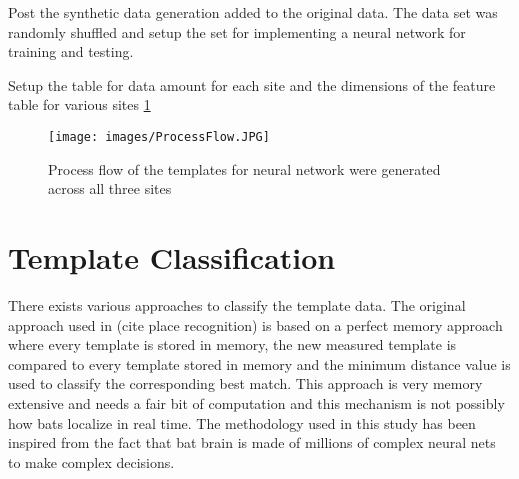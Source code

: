 \documentclass[11pt]{report}
\begin{document}
Post the synthetic data generation added to the original data. The data set was randomly shuffled and setup the set for implementing a neural network for training and testing.

Setup the table for data amount for each site and the dimensions of the feature table for various sites \ref{process}
\begin{figure}[ht]
	\texttt{[image: images/ProcessFlow.JPG]}
	\caption{Process flow of the templates for neural network were generated across all three sites}
	\label{process}
\end{figure}



\chapter{Template Classification}
There exists various approaches to classify the template data. The original approach used in (cite place recognition) is based on a perfect memory approach where every template is stored in memory, the new measured template is compared to every template stored in memory and the minimum distance value is used to classify the corresponding best match. This approach is very memory extensive and needs a fair bit of computation and this mechanism is not possibly how bats localize in real time. The methodology used in this study has been inspired from the fact that bat brain is made of millions of complex neural nets to make complex decisions.
\end{document}
